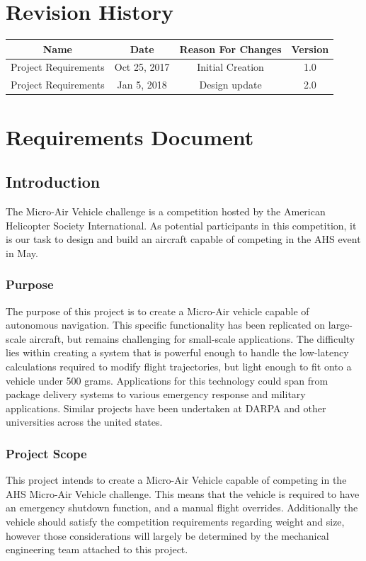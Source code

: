 \documentclass[onecolumn, draftclsnofoot,10pt, compsoc]{IEEEtran}
\begin{document}
\section*{Revision History}

\begin{center}
    \begin{tabular}{|c|c|c|c|}
        \hline
	    Name & Date & Reason For Changes & Version\\
        \hline
	    Project Requirements & Oct 25, 2017 & Initial Creation & 1.0\\
        \hline
		Project Requirements & Jan 5, 2018 & Design update & 2.0\\
        \hline
    \end{tabular}
\end{center}


\section{Requirements Document}

\subsection{Introduction}

The Micro-Air Vehicle challenge is a competition hosted by the American Helicopter Society International. As potential participants in this competition, it is our task to design and build an aircraft capable of competing in the AHS event in May.

\subsubsection{Purpose}

The purpose of this project is to create a Micro-Air vehicle capable of autonomous navigation. This specific functionality has been replicated on large-scale aircraft, but remains challenging for small-scale applications. The difficulty lies within creating a system that is powerful enough to handle the low-latency calculations required to modify flight trajectories, but light enough to fit onto a vehicle under 500 grams. Applications for this technology could span from package delivery systems to various emergency response and military applications. Similar projects have been undertaken at DARPA\cite{r1} and other universities across the united states.

\subsubsection{Project Scope}
This project intends to create a Micro-Air Vehicle capable of competing in the AHS Micro-Air Vehicle challenge. This means that the vehicle is required to have an emergency shutdown function, and a manual flight overrides. Additionally the vehicle should satisfy the competition requirements regarding weight and size, however those considerations will largely be determined by the mechanical engineering team attached to this project.
\end{document}

